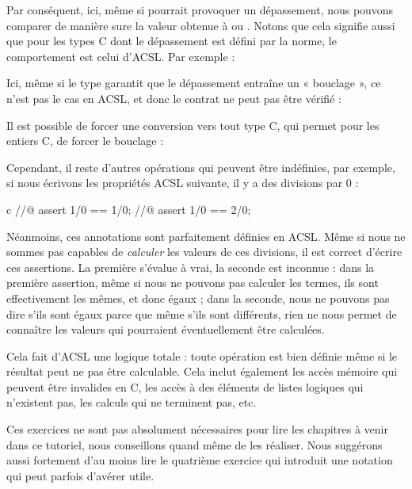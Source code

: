 Par conséquent, ici, même si  pourrait provoquer un dépassement,
nous pouvons comparer de manière sure la valeur obtenue à 
ou . Notons que cela signifie aussi que pour les types C
dont le dépassement est défini par la norme, le comportement est celui d'ACSL.
Par exemple :




Ici, même si le type  garantit que le dépassement entraîne
un « bouclage », ce n'est pas le cas en ACSL, et donc le contrat ne peut pas
être vérifié :




Il est possible de forcer une conversion vers tout type C, qui permet pour les
entiers C, de forcer le bouclage :




Cependant, il reste d'autres opérations qui peuvent être indéfinies, par exemple,
si nous écrivons les propriétés ACSL suivante, il y a des divisions par 0 :


\begin{CodeBlock}{c}
//@ assert 1/0 == 1/0;
//@ assert 1/0 == 2/0;
\end{CodeBlock}


Néanmoins, ces annotations sont parfaitement définies en ACSL. Même si nous ne
sommes pas capables de \textit{calculer} les valeurs de ces divisions, il est
correct d'écrire ces assertions. La première s'évalue à vrai, la seconde est
inconnue : dans la première assertion, même si nous ne pouvons pas calculer
les termes, ils sont effectivement les mêmes, et donc égaux ; dans la seconde,
nous ne pouvons pas dire s'ils sont égaux parce que même s'ils sont différents,
rien ne nous permet de connaître les valeurs qui pourraient éventuellement être
calculées.


Cela fait d'ACSL une logique totale : toute opération est bien définie même si
le résultat peut ne pas être calculable. Cela inclut également les accès mémoire
qui peuvent être invalides en C, les accès à des éléments de listes logiques qui
n'existent pas, les calculs qui ne terminent pas, etc.




Ces exercices ne sont pas absolument nécessaires pour lire les chapitres à
venir dans ce tutoriel, nous conseillons quand même de les réaliser. Nous
suggérons aussi fortement d'au moins lire le quatrième exercice qui introduit
une notation qui peut parfois d'avérer utile.


